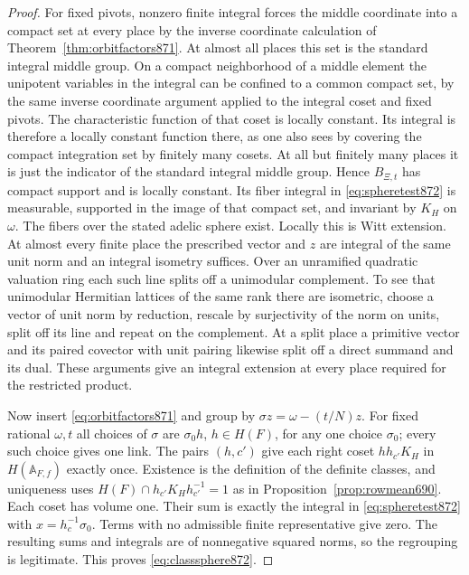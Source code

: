 \documentclass[a4paper,11pt]{article}
\theoremstyle{definition}
\theoremstyle{remark}
\numberwithin{equation}{section}
\begin{document}
\begin{proof}
For fixed pivots, nonzero finite integral forces the middle
coordinate into a compact set at every place by the inverse
coordinate calculation of Theorem~\ref{thm:orbitfactors871}.
At almost all places this set is the standard integral middle
group. On a compact neighborhood of a middle element the
unipotent variables in the integral can be confined to a common
compact set, by the same inverse coordinate argument applied
to the integral coset and fixed pivots. The characteristic
function of that coset is locally constant. Its integral is
therefore a locally constant function there, as one also sees
by covering the compact integration set by finitely many cosets.
At all but finitely many places it is just the indicator of the
standard integral middle group. Hence \(B_{\Xi,t}\) has compact
support and is locally constant. Its fiber integral in
\eqref{eq:spheretest872} is measurable, supported in the image
of that compact set, and invariant by \(K_H\) on \(\omega\).
The fibers over the stated adelic sphere exist. Locally this is
Witt extension. At almost every finite place the prescribed
vector and \(z\) are integral of the same unit norm and an
integral isometry suffices. Over an unramified quadratic
valuation ring each such line splits off a unimodular
complement. To see that unimodular Hermitian lattices of the same
rank there are isometric, choose a vector of unit norm by
reduction, rescale by surjectivity of the norm on units, split
off its line and repeat on the complement. At a split place a primitive vector and its
paired covector with unit pairing likewise split off a direct
summand and its dual. These arguments give an integral
extension at every place required for the restricted product.

Now insert \eqref{eq:orbitfactors871} and group by
\(\sigma z=\omega-(t/N)z\).
For fixed rational \(\omega,t\) all choices of \(\sigma\) are
\(\sigma_0 h\), \(h\in H(F)\), for any one choice \(\sigma_0\);
every such choice gives one link. The pairs \((h,c')\) give
each right coset \(h h_{c'}K_H\) in \(H(\mathbb A_{F,f})\)
exactly once. Existence is the definition of the definite
classes, and uniqueness uses
\(H(F)\cap h_{c'}K_H h_{c'}^{-1}=1\) as in
Proposition~\ref{prop:rowmean690}. Each coset has volume one.
Their sum is exactly the integral in \eqref{eq:spheretest872}
with \(x=h_c^{-1}\sigma_0\).
Terms with no admissible finite representative give zero.
The resulting sums and integrals are of nonnegative squared
norms, so the regrouping is legitimate. This proves
\eqref{eq:classsphere872}.
\end{proof}
\end{document}
